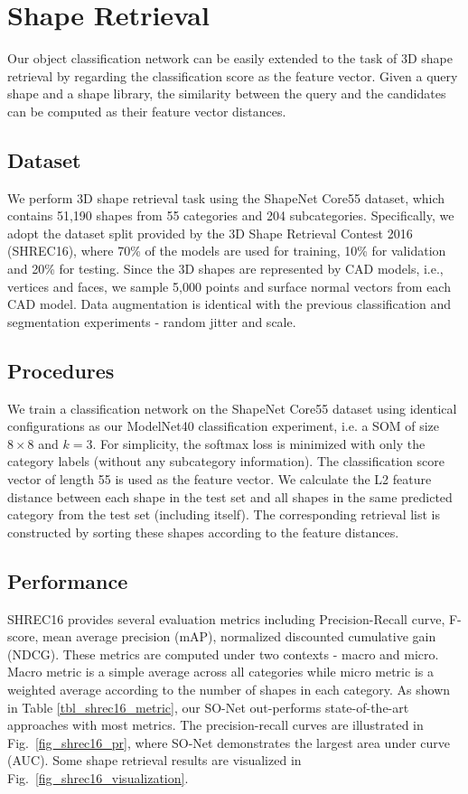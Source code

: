 \documentclass[10pt,twocolumn,letterpaper]{article}
\begin{document}
\section{Shape Retrieval}\label{sec_shape_retrieval}
Our object classification network can be easily extended to the task of 3D shape retrieval by regarding the classification score as the feature vector. Given a query shape and a shape library, the similarity between the query and the candidates can be computed as their feature vector distances.

\subsection{Dataset}
We perform 3D shape retrieval task using the ShapeNet Core55 dataset, which contains 51,190 shapes from 55 categories and 204 subcategories. Specifically, we adopt the dataset split provided by the 3D Shape Retrieval Contest 2016 (SHREC16), where 70\% of the models are used for training, 10\% for validation and 20\% for testing. Since the 3D shapes are represented by CAD models, i.e., vertices and faces, we sample 5,000 points and surface normal vectors from each CAD model. Data augmentation is identical with the previous classification and segmentation experiments - random jitter and scale.

\subsection{Procedures}
We train a classification network on the ShapeNet Core55 dataset using identical configurations as our ModelNet40 classification experiment, i.e. a SOM of size $8\times 8$ and $k=3$. For simplicity, the softmax loss is minimized with only the category labels (without any subcategory information). The classification score vector of length 55 is used as the feature vector. We calculate the L2 feature distance between 
each shape in the test set 
and all shapes in the same predicted category from the test set (including itself). The corresponding retrieval list is constructed by sorting these shapes according to the feature distances.

\subsection{Performance}
SHREC16 provides several evaluation metrics including Precision-Recall curve, F-score, mean average precision (mAP), normalized discounted cumulative gain (NDCG). These metrics are computed under two contexts - macro and micro. Macro metric is a simple average across all categories while micro metric is a weighted average according to the number of shapes in each category. As shown in Table \ref{tbl_shrec16_metric}, our SO-Net out-performs state-of-the-art approaches with most metrics. The precision-recall curves are illustrated in Fig.~\ref{fig_shrec16_pr}, where SO-Net demonstrates the largest area under curve (AUC).
Some shape retrieval results are visualized in Fig.~\ref{fig_shrec16_visualization}.
\end{document}
